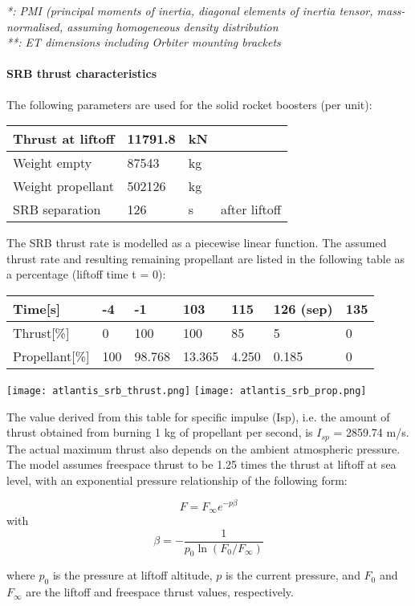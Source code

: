 \documentclass[Orbiter User Manual.tex]{subfiles}
\begin{document}
\noindent
\textit{*:	PMI (principal moments of inertia, diagonal elements of inertia tensor, mass-normalised, assuming homogeneous density distribution}\\
\textit{**:	ET dimensions including Orbiter mounting brackets}

\paragraph{SRB thrust characteristics}
The following parameters are used for the solid rocket boosters (per unit):

\begin{table}[H]
\centering
\begin{tabular}{|l|l|l|l|}
\hline
Thrust at liftoff & 11791.8 & kN & \\
\hline
Weight empty & 87543 & kg & \\
\hline
Weight propellant & 502126 & kg & \\
\hline
SRB separation & 126 & s & after liftoff\\
\hline
\end{tabular}
\end{table}

The SRB thrust rate is modelled as a piecewise linear function. The assumed thrust rate and resulting remaining propellant are listed in the following table as a percentage (liftoff time t = 0):

\begin{table}[H]
\centering
\begin{tabular}{|l|l|l|l|l|l|l|}
\hline
Time[s] 	 			& -4  & -1     & 103    & 115   & 126 (sep) & 135 \\
\hline
Thrust[\%] 			& 0   & 100    & 100    & 85    & 5         & 0   \\
\hline
Propellant[\%]  & 100 & 98.768 & 13.365 & 4.250 & 0.185     & 0   \\
\hline
\end{tabular}
\end{table}

\texttt{[image: atlantis\_srb\_thrust.png]}
\texttt{[image: atlantis\_srb\_prop.png]}

The value derived from this table for specific impulse (Isp), i.e. the amount of thrust obtained from burning 1 kg of propellant per second, is
$I_{sp}$ = 2859.74 m/s.
The actual maximum thrust also depends on the ambient atmospheric pressure. The model assumes freespace thrust to be 1.25 times the thrust at liftoff at sea level, with an exponential pressure relationship of the following form:
\begin{center}
\[F = F_\infty e^{-p\beta}\] with \[\beta = -\frac{1}{p_0\ln{(F_0/F_\infty)}}\]
\end{center}
where $p_0$ is the pressure at liftoff altitude, $p$ is the current pressure, and $F_0$ and $F_\infty$ are the liftoff and freespace thrust values, respectively.
\end{document}

